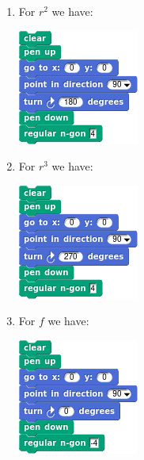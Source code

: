 \documentclass[noauthor,nooutcomes,12pt,hints,handout]{ximera}
\begin{document}
\begin{question}
\begin{freeResponse}
\begin{enumerate}
\begin{center}
      \end{center}
    \item For $r^2$ we have:
      \begin{center}
        \includegraphics[width=.3\textwidth]{r2SqSCRIPT.png}   \qquad {}
      \end{center}
    \item For $r^3$ we have:
      \begin{center}
        \includegraphics[width=.3\textwidth]{r3SqSCRIPT.png}   \qquad {}
      \end{center}
    \item For $f$ we have:
      \begin{center}
        \includegraphics[width=.3\textwidth]{fSqSCRIPT.png}   \qquad {}

\end{center}
\end{enumerate}
\end{freeResponse}
\end{question}
\end{document}
